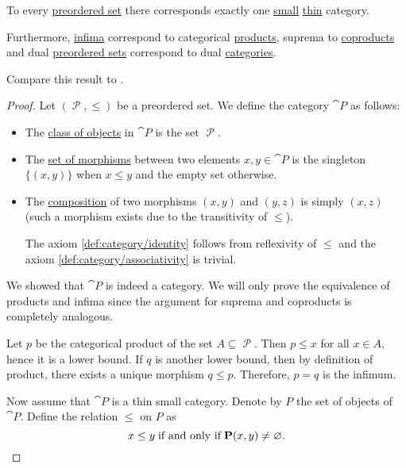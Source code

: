 \begin{proposition}\label{thm:preorder_category_correspondence}
  To every \hyperref[def:preordered_set]{preordered set} there corresponds exactly one \hyperref[def:category_size]{small} \hyperref[def:thin_category]{thin} category.

  Furthermore, \hyperref[def:partially_ordered_set_extremal_points/supremum_and_infimum]{infima} correspond to categorical \hyperref[def:categorical_product]{products}, suprema to \hyperref[def:categorical_coproduct]{coproducts} and dual \hyperref[def:preordered_set/duality]{preordered sets} correspond to dual \hyperref[def:dual_category]{categories}.

  Compare this result to .
\end{proposition}
\begin{proof}
  \SufficiencySubProof Let \( (\mscrP, \leq) \) be a preordered set. We define the category \( \cat{P} \) as follows:
  \begin{itemize}
    \item The \hyperref[def:category/objects]{class of objects} in \( \cat{P} \) is the set \( \mscrP \).
    \item The \hyperref[def:category/morphisms]{set of morphisms} between two elements \( x, y \in \cat{P} \) is the singleton \( \{ (x, y) \} \) when \( x \leq y \) and the empty set otherwise.
    \item The \hyperref[def:category/composition]{composition} of two morphisms \( (x, y) \) and \( (y, z) \) is simply \( (x, z) \) (such a morphism exists due to the transitivity of \( \leq \)).

    The axiom \ref{def:category/identity} follows from reflexivity of \( \leq \) and the axiom \ref{def:category/associativity} is trivial.
  \end{itemize}

  We showed that \( \cat{P} \) is indeed a category. We will only prove the equivalence of products and infima since the argument for suprema and coproducts is completely analogous.

  Let \( p \) be the categorical product of the set \( A \subseteq \mscrP \). Then \( p \leq x \) for all \( x \in A \), hence it is a lower bound. If \( q \) is another lower bound, then by definition of product, there exists a unique morphism \( q \leq p \). Therefore, \( p = q \) is the infimum.

  \NecessitySubProof Now assume that \( \cat{P} \) is a thin small category. Denote by \( P \) the set of objects of \( \cat{P} \). Define the relation \( \leq \) on \( P \) as
  \begin{equation*}
    x \leq y \T{if and only if} \cat{P}(x, y) \neq \varnothing.
  \end{equation*}


\end{proof}
